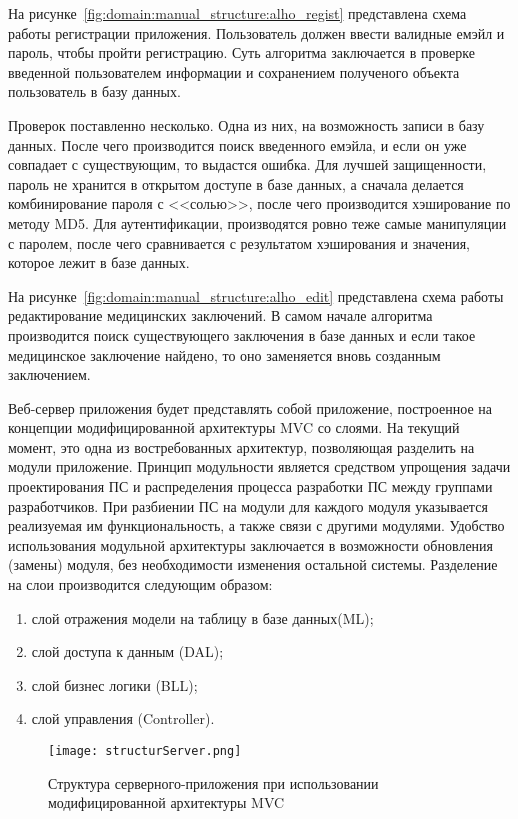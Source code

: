 На рисунке~\ref{fig:domain:manual_structure:alho_regist} представлена схема работы регистрации приложения. Пользователь должен ввести валидные емэйл и пароль, чтобы пройти регистрацию. Суть алгоритма заключается в проверке введенной пользователем информации и сохранением полученого объекта пользователь в базу данных. 

Проверок поставленно несколько. Одна из них, на возможность записи в базу данных. После чего производится поиск введенного емэйла, и если он уже совпадает с существующим, то выдастся ошибка. Для лучшей защищенности, пароль не хранится в открытом доступе в базе данных, а сначала делается комбинирование пароля с <<солью>>, после чего производится хэширование по методу MD5. Для аутентификации, производятся ровно теже самые манипуляции с паролем, после чего сравнивается с результатом хэширования и значения, которое лежит в базе данных. 

На рисунке~\ref{fig:domain:manual_structure:alho_edit} представлена схема работы редактирование медицинских заключений. В самом начале алгоритма производится поиск существующего заключения в базе данных и если такое медицинское заключение найдено, то оно заменяется вновь созданным заключением.

Веб-сервер приложения будет представлять собой приложение, построенное на концепции модифицированной архитектуры MVC со слоями. На текущий момент, это одна из востребованных архитектур, позволяющая разделить на модули приложение. Принцип модульности является средством упрощения задачи проектирования ПС и распределения процесса разработки ПС между группами разработчиков. При разбиении ПС на модули для каждого модуля указывается реализуемая им функциональность, а также связи с другими модулями. Удобство использования модульной архитектуры заключается в возможности обновления (замены) модуля, без необходимости изменения остальной системы. Разделение на слои производится следующим образом:
\begin{enumerate}
  \item слой отражения модели на таблицу в базе данных(ML);
  \item слой доступа к данным (DAL);
  \item слой бизнес логики (BLL);
  \item слой управления (Controller).
\end{enumerate}

\begin{figure}[ht]
\centering
  \texttt{[image: structurServer.png]}  
  \caption{Структура серверного-приложения при использовании модифицированной архитектуры MVC}
  \label{fig:domain:manual_structure:structural_server}
\end{figure}

